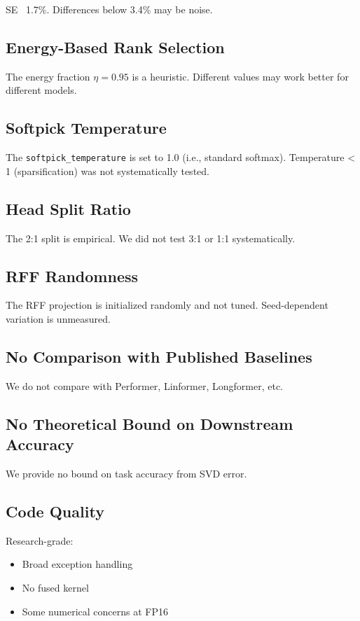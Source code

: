 SE ~1.7\%. Differences below 3.4\% may be noise.

\subsection{Energy-Based Rank Selection}

The energy fraction $\eta = 0.95$ is a heuristic. Different values may 
work better for different models.

\subsection{Softpick Temperature}

The \texttt{softpick\_temperature} is set to 1.0 (i.e., standard softmax). 
Temperature < 1 (sparsification) was not systematically tested.

\subsection{Head Split Ratio}

The 2:1 split is empirical. We did not test 3:1 or 1:1 systematically.

\subsection{RFF Randomness}

The RFF projection is initialized randomly and not tuned. Seed-dependent 
variation is unmeasured.

\subsection{No Comparison with Published Baselines}

We do not compare with Performer, Linformer, Longformer, etc.

\subsection{No Theoretical Bound on Downstream Accuracy}

We provide no bound on task accuracy from SVD error.

\subsection{Code Quality}

Research-grade:
\begin{itemize}
\item Broad exception handling
\item No fused kernel
\item Some numerical concerns at FP16

\end{itemize}
